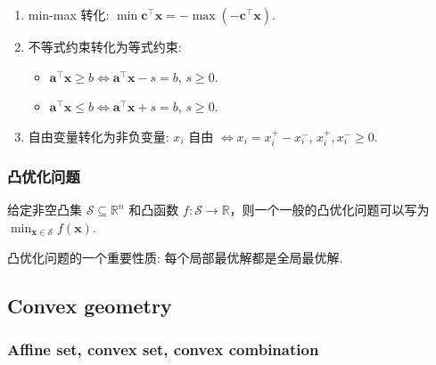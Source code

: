 \begin{enumerate}
\item {}min-max 转化: $\min \bm{c}^\top \bm{x} = -\max (-\bm{c}^\top \bm{x})$.


\item {}不等式约束转化为等式约束:

\begin{itemize}
\item {}$\bm{a}^\top \bm{x} \geq b \iff \bm{a}^\top \bm{x} - s = b$, $s \geq 0$.


\item {}$\bm{a}^\top \bm{x} \leq b \iff \bm{a}^\top \bm{x} + s = b$, $s \geq 0$.


\end{itemize}


\item {}自由变量转化为非负变量: $x_i$ 自由 $\iff x_i = x_i^+ - x_i^-$, $x_i^+, x_i^- \geq 0$.


\end{enumerate}

\subsubsection{凸优化问题}

给定非空凸集 $\mathcal{S} \subseteq \mathbb{R}^n$ 和凸函数 $f: \mathcal{S} \to \mathbb{R}$，则一个一般的凸优化问题可以写为 $\min_{\bm{x} \in \mathcal{S}} f(\bm{x})$.


\begin{propositionblock}{}
凸优化问题的一个重要性质: 每个局部最优解都是全局最优解.

\end{propositionblock}

\subsection{Convex geometry}

\subsubsection{Affine set, convex set, convex combination}


